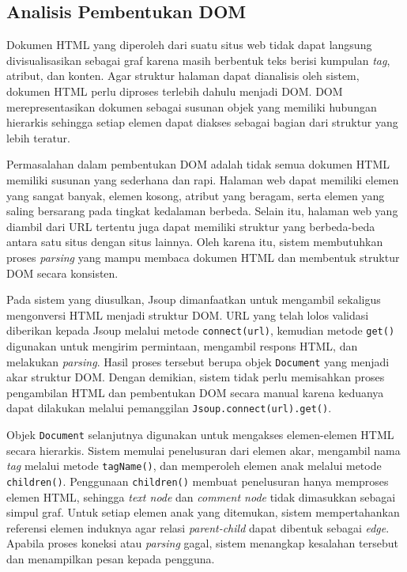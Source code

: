 \subsection{Analisis Pembentukan DOM}
Dokumen HTML yang diperoleh dari suatu situs web tidak dapat langsung divisualisasikan sebagai graf karena masih berbentuk teks berisi kumpulan \textit{tag}, atribut, dan konten. Agar struktur halaman dapat dianalisis oleh sistem, dokumen HTML perlu diproses terlebih dahulu menjadi DOM. DOM merepresentasikan dokumen sebagai susunan objek yang memiliki hubungan hierarkis sehingga setiap elemen dapat diakses sebagai bagian dari struktur yang lebih teratur.

Permasalahan dalam pembentukan DOM adalah tidak semua dokumen HTML memiliki susunan yang sederhana dan rapi. Halaman web dapat memiliki elemen yang sangat banyak, elemen kosong, atribut yang beragam, serta elemen yang saling bersarang pada tingkat kedalaman berbeda. Selain itu, halaman web yang diambil dari URL tertentu juga dapat memiliki struktur yang berbeda-beda antara satu situs dengan situs lainnya. Oleh karena itu, sistem membutuhkan proses \textit{parsing} yang mampu membaca dokumen HTML dan membentuk struktur DOM secara konsisten.

Pada sistem yang diusulkan, Jsoup dimanfaatkan untuk mengambil sekaligus mengonversi HTML menjadi struktur DOM. URL yang telah lolos validasi diberikan kepada Jsoup melalui metode \texttt{connect(url)}, kemudian metode \texttt{get()} digunakan untuk mengirim permintaan, mengambil respons HTML, dan melakukan \textit{parsing}. Hasil proses tersebut berupa objek \texttt{Document} yang menjadi akar struktur DOM. Dengan demikian, sistem tidak perlu memisahkan proses pengambilan HTML dan pembentukan DOM secara manual karena keduanya dapat dilakukan melalui pemanggilan \texttt{Jsoup.connect(url).get()}.

Objek \texttt{Document} selanjutnya digunakan untuk mengakses elemen-elemen HTML secara hierarkis. Sistem memulai penelusuran dari elemen akar, mengambil nama \textit{tag} melalui metode \texttt{tagName()}, dan memperoleh elemen anak melalui metode \texttt{children()}. Penggunaan \texttt{children()} membuat penelusuran hanya memproses elemen HTML, sehingga \textit{text node} dan \textit{comment node} tidak dimasukkan sebagai simpul graf. Untuk setiap elemen anak yang ditemukan, sistem mempertahankan referensi elemen induknya agar relasi \textit{parent-child} dapat dibentuk sebagai \textit{edge}. Apabila proses koneksi atau \textit{parsing} gagal, sistem menangkap kesalahan tersebut dan menampilkan pesan kepada pengguna.

